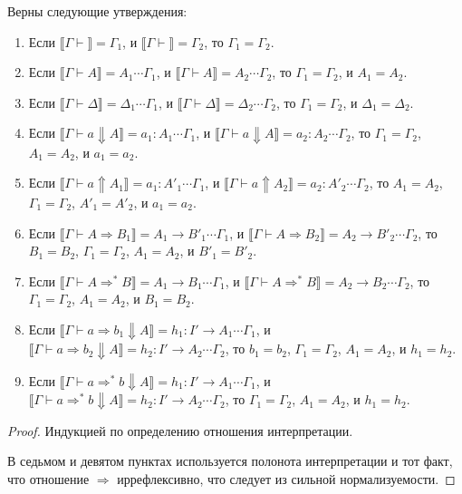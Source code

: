 \documentclass{amsart}
\theoremstyle{definition}
\theoremstyle{remark}
\newcommand{\red}{\Rightarrow}
\renewcommand{\ll}{\llbracket}
\newcommand{\rr}{\rrbracket}
\numberwithin{figure}{section}
\begin{document}
\begin{lem}
Верны следующие утверждения:
\begin{enumerate}
\item Если $\ll \Gamma \vdash \rr = \Gamma_1$, и $\ll \Gamma \vdash \rr = \Gamma_2$, то $\Gamma_1 = \Gamma_2$.
\item Если $\ll \Gamma \vdash A \rr = A_1 \dotsb \Gamma_1$, и $\ll \Gamma \vdash A \rr = A_2 \dotsb \Gamma_2$, то $\Gamma_1 = \Gamma_2$, и $A_1 = A_2$.
\item Если $\ll \Gamma \vdash \Delta \rr = \Delta_1 \dotsb \Gamma_1$, и $\ll \Gamma \vdash \Delta \rr = \Delta_2 \dotsb \Gamma_2$, то $\Gamma_1 = \Gamma_2$, и $\Delta_1 = \Delta_2$.
\item Если $\ll \Gamma \vdash a \Downarrow A \rr = a_1 : A_1 \dotsb \Gamma_1$, и $\ll \Gamma \vdash a \Downarrow A \rr = a_2 : A_2 \dotsb \Gamma_2$, то $\Gamma_1 = \Gamma_2$, $A_1 = A_2$, и $a_1 = a_2$.
\item Если $\ll \Gamma \vdash a \Uparrow A_1 \rr = a_1 : A'_1 \dotsb \Gamma_1$, и $\ll \Gamma \vdash a \Uparrow A_2 \rr = a_2 : A'_2 \dotsb \Gamma_2$, то $A_1 = A_2$, $\Gamma_1 = \Gamma_2$, $A'_1 = A'_2$, и $a_1 = a_2$.
\item Если $\ll \Gamma \vdash A \red B_1 \rr = A_1 \to B'_1 \dotsb \Gamma_1$, и $\ll \Gamma \vdash A \red B_2 \rr = A_2 \to B'_2 \dotsb \Gamma_2$, то $B_1 = B_2$, $\Gamma_1 = \Gamma_2$, $A_1 = A_2$, и $B'_1 = B'_2$.
\item Если $\ll \Gamma \vdash A \red^* B \rr = A_1 \to B_1 \dotsb \Gamma_1$, и $\ll \Gamma \vdash A \red^* B \rr = A_2 \to B_2 \dotsb \Gamma_2$, то $\Gamma_1 = \Gamma_2$, $A_1 = A_2$, и $B_1 = B_2$.
\item Если $\ll \Gamma \vdash a \red b_1 \Downarrow A \rr = h_1 : I' \to A_1 \dotsb \Gamma_1$, и $\ll \Gamma \vdash a \red b_2 \Downarrow A \rr = h_2 : I' \to A_2 \dotsb \Gamma_2$, то $b_1 = b_2$, $\Gamma_1 = \Gamma_2$, $A_1 = A_2$, и $h_1 = h_2$.
\item Если $\ll \Gamma \vdash a \red^* b \Downarrow A \rr = h_1 : I' \to A_1 \dotsb \Gamma_1$, и $\ll \Gamma \vdash a \red^* b \Downarrow A \rr = h_2 : I' \to A_2 \dotsb \Gamma_2$, то $\Gamma_1 = \Gamma_2$, $A_1 = A_2$, и $h_1 = h_2$.
\end{enumerate}
\end{lem}
\begin{proof}
Индукцией по определению отношения интерпретации.

В седьмом и девятом пунктах используется полонота интерпретации и тот факт, что отношение $\red$ иррефлексивно, что следует из сильной нормализуемости.
\end{proof}
\end{document}
